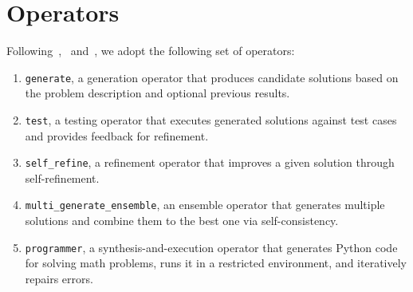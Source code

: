 \documentclass{article}
\theoremstyle{plain}
\theoremstyle{definition}
\theoremstyle{remark}
\begin{document}



\newpage
\appendix
\onecolumn
\section{Operators}
\label{app:Operators}
Following~\citet{zhang_aflow_2025},~\citet{zhang_multi-agent_2025} and~\citet{zheng_mermaidflow_2025}, we adopt the following set of operators:
\begin{enumerate}
    \item \texttt{generate}, 
    a generation operator that produces candidate solutions based on the problem description and optional previous results.

    \item \texttt{test}, 
    a testing operator that executes generated solutions against test cases and provides feedback for refinement.

    \item \texttt{self\_refine}, 
    a refinement operator that improves a given solution through self-refinement.

    \item \texttt{multi\_generate\_ensemble}, 
    an ensemble operator that generates multiple solutions and combine them to the best one via self-consistency.

    \item \texttt{programmer}, 
    a synthesis-and-execution operator that generates Python code for solving math problems, runs it in a restricted environment, and iteratively repairs errors.
\end{enumerate}
\end{document}
